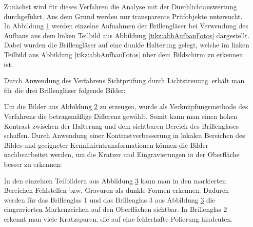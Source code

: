 Zunächst wird für dieses Verfahren die Analyse mit der Durchlichtauswertung durchgeführt.
Aus dem Grund werden nur transparente Prüfobjekte untersucht.
In Abbildung \ref{tikz:abbStreifenaufnahmen} werden einzelne Aufnahmen der Brillengläser bei Verwendung des Aufbaus aus dem linken Teilbild aus Abbildung \ref{tikz:abbAufbauFotos} dargestellt.
Dabei wurden die Brillengläser auf eine dunkle Halterung gelegt, welche im linken Teilbild aus Abbildung \ref{tikz:abbAufbauFotos} über dem Bildschirm zu erkennen ist.

{
	\begin{figure}[H]
		\centering
		
		\label{tikz:abbStreifenaufnahmen}
	\end{figure}
}

\noindent
Durch Anwendung des Verfahrens \glqq Sichtprüfung durch Lichtstreuung\grqq ~erhält man für die drei Brillengläser folgende Bilder:

{
	\begin{figure}[H]
		\centering
		
		\label{tikz:abbCombinePatternPictures}
	\end{figure}
}

\noindent
Um die Bilder aus Abbildung \ref{tikz:abbCombinePatternPictures} zu erzeugen, wurde als Verknüpfungsmethode des  Verfahrens die betragsmäßige Differenz gewählt.
Somit kann man einen hohen Kontrast zwischen der Halterung und dem sichtbaren Bereich des Brillenglases schaffen.
Durch Anwendung einer Kontrastverbesserung in lokalen Bereichen des Bildes und geeigneter Kennlinientransformationen können die Bilder nachbearbeitet werden, um die Kratzer und Eingravierungen in der Oberfläche besser zu erkennen:

{
	\begin{figure}[H]
		\centering
		
		\label{tikz:abbNachbearbeitung}
	\end{figure}
}

\noindent
In den einzelnen Teilbildern aus Abbildung \ref{tikz:abbNachbearbeitung} kann man in den markierten Bereichen Fehlstellen bzw. Gravuren als dunkle Formen erkennen.
Dadurch werden für das Brillenglas 1 und das Brillenglas 3 aus Abbildung \ref{tikz:abbNachbearbeitung} die eingravierten Markenzeichen auf den Oberflächen sichtbar.
In Brillenglas 2 erkennt man viele Kratzspuren, die auf eine fehlerhafte Polierung hindeuten.